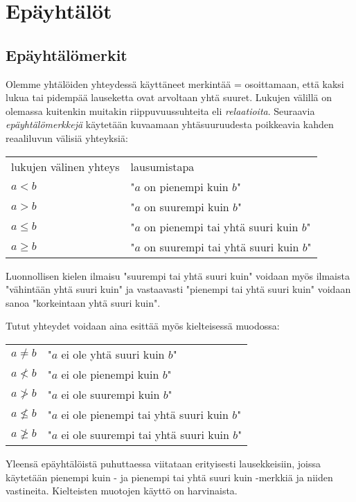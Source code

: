 \chapter{Epäyhtälöt}

\section{Epäyhtälömerkit}

Olemme yhtälöiden yhteydessä käyttäneet merkintää = osoittamaan, että kaksi lukua tai pidempää lauseketta ovat arvoltaan yhtä suuret. Lukujen välillä on olemassa kuitenkin muitakin riippuvuussuhteita eli \emph{relaatioita}. Seuraavia \emph{epäyhtälömerkkejä} käytetään kuvaamaan yhtäsuuruudesta poikkeavia kahden reaaliluvun välisiä yhteyksiä:


\begin{tabular}{ll}
lukujen välinen yhteys & lausumistapa \\
$a<b$ &  "$a$ on pienempi kuin $b$"\\
$a>b$ & "$a$ on suurempi kuin $b$"\\
$a \leq b$ & "$a$ on pienempi tai yhtä suuri kuin $b$" \\
$a \geq b$ & "$a$ on suurempi tai yhtä suuri kuin $b$" \\
\end{tabular}

Luonnollisen kielen ilmaisu "suurempi tai yhtä suuri kuin" voidaan myös ilmaista
"vähintään yhtä suuri kuin" ja vastaavasti "pienempi tai yhtä suuri kuin"
voidaan sanoa "korkeintaan yhtä suuri kuin".

Tutut yhteydet voidaan aina esittää myös kielteisessä muodossa:

\begin{tabular}{ll}
$a\neq b$ & "$a$ ei ole yhtä suuri kuin $b$" \\
$a \nless b$ &  "$a$ ei ole pienempi kuin $b$"\\
$a \ngtr b$ & "$a$ ei ole suurempi kuin $b$"\\
$a \nleq b$ & "$a$ ei ole pienempi tai yhtä suuri kuin $b$" \\
$a \ngeq b$ & "$a$ ei ole suurempi tai yhtä suuri kuin $b$" \\
\end{tabular}

Yleensä epäyhtälöistä puhuttaessa viitataan erityisesti lausekkeisiin, joissa käytetään pienempi kuin - ja pienempi tai yhtä suuri kuin -merkkiä ja niiden vastineita. Kielteisten muotojen käyttö on harvinaista.

